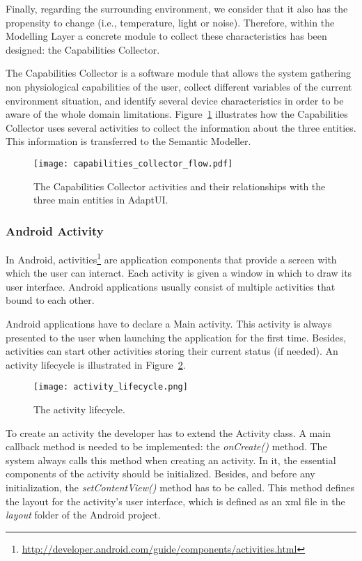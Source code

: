 Finally, regarding the surrounding environment, we consider that it also has the 
propensity to change (i.e., temperature, light or noise). Therefore, within the 
Modelling Layer a concrete module to collect these characteristics has been 
designed: the Capabilities Collector.

The Capabilities Collector is a software module that allows the system gathering 
non physiological capabilities of the user, collect different variables of the 
current environment situation, and identify several device characteristics in 
order to be aware of the whole domain limitations. Figure~\ref{fig:capabilities_collector_flow}
illustrates how the Capabilities Collector uses several activities to collect
the information about the three entities. This information is transferred to the
Semantic Modeller.

\begin{figure}
\centering
\texttt{[image: capabilities\_collector\_flow.pdf]}
\caption{The Capabilities Collector activities and their relationships with the
three main entities in AdaptUI.}
\label{fig:capabilities_collector_flow}
\end{figure}


\subsubsection{Android Activity}
\label{sec:activities}

In Android, activities\footnote{\url{http://developer.android.com/guide/components/activities.html}}
are application components that provide a screen with which the user can interact.
Each activity is given a window in which to draw its user interface. Android
applications usually consist of multiple activities that bound to each other. 

Android applications have to declare a Main activity. This activity is always
presented to the user when launching the application for the first time. Besides,
activities can start other activities storing their current status (if needed).
An activity lifecycle is illustrated in Figure~\ref{fig:activity_lifecycle}.

\begin{figure}[H]
\centering
\texttt{[image: activity\_lifecycle.png]}
\caption{The activity lifecycle.}
\label{fig:activity_lifecycle}
\end{figure}

To create an activity the developer has to extend the Activity class. A main
callback method is needed to be implemented: the \textit{onCreate()} method.
The system always calls this method when creating an activity. In it, the
essential components of the activity should be initialized. Besides, and before
any initialization, the \textit{setContentView()} method has to be called. This
method defines the layout for the activity's user interface, which is defined as
an \ac{xml} file in the \textit{layout} folder of the Android project.

